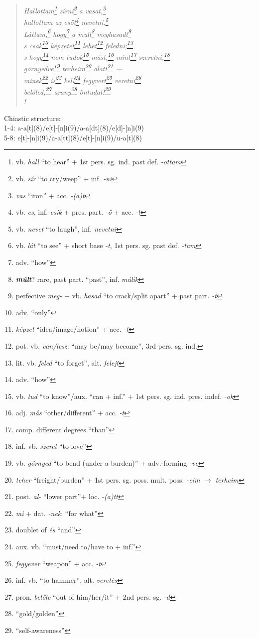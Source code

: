 \documentclass[a4paper,12pt,twoside,final]{book}
\begin{document}
\begin{verse}%
  \it
  Hallottam\footnote{vb. \emph{hall} ``to hear'' + 1st
  pers. sg. ind. past def. \emph{-ottam}} sírni\footnote{vb.
  \emph{sír} ``to cry/weep'' + inf. \emph{-ni}} a
  vasat,\footnote{\emph{vas} ``iron'' + acc. \emph{-(a)t}} \\
  hallottam az esőt\footnote{vb. \emph{es}, inf. \emph{esik} +
  pres. part. \emph{-ő} + acc. \emph{-t}} nevetni.\footnote{vb.
  \emph{nevet} ``to laugh'', inf. \emph{nevetni}} \\
  Láttam,\footnote{vb. \emph{lát} ``to see'' +
  short base \emph{-t}, 1st pers. sg. past def. \emph{-tam}}
  hogy\footnote{adv. ``how''} a mult\footnote{\textbf{\emph{múlt}}?
  rare, past part. ``past'', inf. \emph{múlik}}
  meghasadt\footnote{perfective \emph{meg-} + vb.
  \emph{hasad} ``to crack/split apart'' + past
  part. \emph{-t}} \\
  s csak\footnote{adv. ``only''} képzetet\footnote{\emph{képzet}
  ``idea/image/notion'' + acc. \emph{-t}}
  lehet\footnote{pot. vb. \emph{van/lesz}:
  ``may be/may become'', 3rd pers. sg. ind.}
  feledni;\footnote{lit. vb. \emph{feled} ``to forget'', alt. \emph{felejt}} \\
  s hogy\footnote{adv. ``how''} nem tudok\footnote{vb.
  \emph{tud} ``to know''/aux. ``can + inf.'' + 1st
  pers. sg. ind. pres. indef. \emph{-ok}}
  mást,\footnote{adj. \emph{más} ``other/different'' + acc. \emph{-t}}
  mint\footnote{comp. different degrees ``than''}
  szeretni,\footnote{inf. vb. \emph{szeret} ``to love''} \\
  görnyedve\footnote{vb. \emph{görnyed} ``to bend (under a
  burden)'' + adv.-forming \emph{-ve}} terheim\footnote{\emph{teher}
  ``freight/burden'' + 1st
  pers. sg. poss. mult. poss. \emph{-eim} $\rightarrow$ \emph{terheim}}
  alatt\footnote{post. \emph{al-} ``lower part''+ loc. \emph{-(a)tt}}
  --- \\
  minek\footnote{\emph{mi} + dat. \emph{-nek}: ``for what''}
  is\footnote{doublet of \emph{és} ``and''}
  kell\footnote{aux. vb. ``must/need to/have to + inf.''}
  fegyvert\footnote{\emph{fegyever} ``weapon'' + acc. \emph{-t}}
    veretni\footnote{inf. vb. ``to hammer'', alt. \emph{veretés}} \\
  belőled,\footnote{pron. \emph{belőle} ``out of him/her/it'' + 2nd
  pers. sg. \emph{-d}} arany\footnote{``gold/golden''}
  öntudat!\footnote{``self-awareness''} \\!
\end{verse}

\noindent Chiastic structure: \\
1-4: a-a[t](8)/e[t]-[n]i(9)/a-a[dt](8)/e[d]-[n]i(9) \\
5-8: e[t]-[n]i(9)/a-a[tt](8)/e[t]-[n]i(9)/u-a[t](8)
\end{document}
